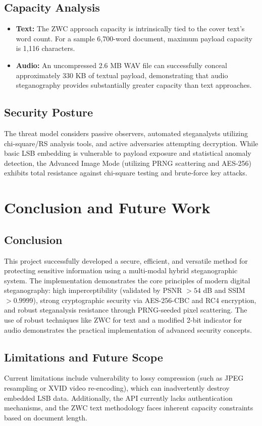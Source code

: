 \documentclass[12pt,a4paper]{report}
\begin{document}
\section{Capacity Analysis}
\begin{itemize}
    \item \textbf{Text:} The ZWC approach capacity is intrinsically tied to the cover text's word count. For a sample 6,700-word document, maximum payload capacity is 1,116 characters.
    \item \textbf{Audio:} An uncompressed 2.6 MB WAV file can successfully conceal approximately 330 KB of textual payload, demonstrating that audio steganography provides substantially greater capacity than text approaches.
\end{itemize}

\section{Security Posture}
The threat model considers passive observers, automated steganalysts utilizing chi-square/RS analysis tools, and active adversaries attempting decryption. While basic LSB embedding is vulnerable to payload exposure and statistical anomaly detection, the Advanced Image Mode (utilizing PRNG scattering and AES-256) exhibits total resistance against chi-square testing and brute-force key attacks. 

\chapter{Conclusion and Future Work}

\section{Conclusion}
This project successfully developed a secure, efficient, and versatile method for protecting sensitive information using a multi-modal hybrid steganographic system. The implementation demonstrates the core principles of modern digital steganography: high imperceptibility (validated by PSNR $> 54$ dB and SSIM $> 0.9999$), strong cryptographic security via AES-256-CBC and RC4 encryption, and robust steganalysis resistance through PRNG-seeded pixel scattering. The use of robust techniques like ZWC for text and a modified 2-bit indicator for audio demonstrates the practical implementation of advanced security concepts.

\section{Limitations and Future Scope}
Current limitations include vulnerability to lossy compression (such as JPEG resampling or XVID video re-encoding), which can inadvertently destroy embedded LSB data. Additionally, the API currently lacks authentication mechanisms, and the ZWC text methodology faces inherent capacity constraints based on document length.
\end{document}
